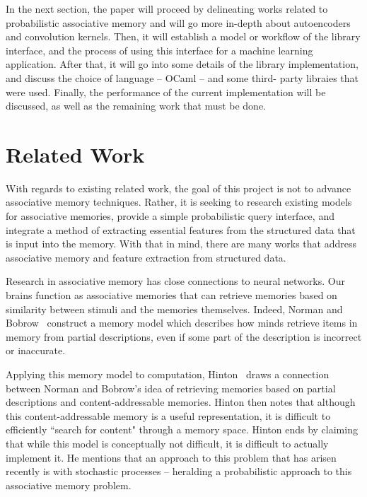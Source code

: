 \documentclass{sig-alternate}
\begin{document}
In the next section, the paper will proceed by delineating works related to 
probabilistic associative memory and will go more in-depth about autoencoders 
and convolution kernels. Then, it will establish a model or workflow of the 
library interface, and the process of using this interface for a machine
learning application. After that, it will go into some details of the library
implementation, and discuss the choice of language -- OCaml -- and some third-
party libraies that were used. Finally, the performance of the current
implementation will be discussed, as well as the remaining work that must be done.

\section{Related Work}
\label{sec:related_work}

With regards to existing related work, the goal of this project is not to advance associative memory 
techniques. Rather, it is seeking to research existing models for associative memories, provide a 
simple probabilistic query interface, and integrate a method of extracting essential features from 
the structured data that is input into the memory. With that in mind, there are many works that 
address associative memory and feature extraction from structured data.

Research in associative memory has close connections to neural networks. Our brains function as 
associative memories that can retrieve memories based on similarity between stimuli and the memories 
themselves.  Indeed, Norman and Bobrow~\cite{bobrow} construct a memory model which describes how 
minds retrieve items in memory from partial descriptions, even if some part of the description is 
incorrect or inaccurate. 

Applying this memory model to computation, Hinton~\cite{hinton} draws a connection between Norman 
and Bobrow's idea of retrieving memories based on partial descriptions and content-addressable 
memories.  Hinton then notes that although this content-addressable memory is a useful 
representation, it is difficult to efficiently ``search for content" through a memory space. 
Hinton ends by claiming that while this model is conceptually not difficult, it is difficult to 
actually implement it. He mentions that an approach to this problem that has arisen recently is with 
stochastic processes -- heralding a probabilistic approach to this associative memory problem.
\end{document}
